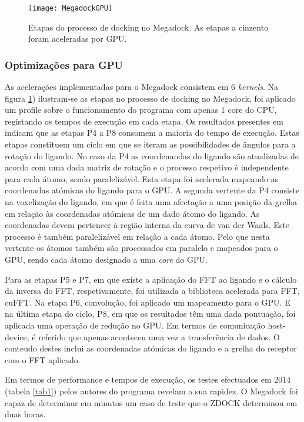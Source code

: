    \begin{figure}[ht]
  \centering
    {\texttt{[image: MegadockGPU]}}
  \caption{Etapas do processo de docking no Megadock. As etapas a cinzento foram aceleradas por GPU\cite{shimoda2015protein}. }
  \label{megadockGPU}
\end{figure}
 \subsubsection{Optimizações para GPU}
As acelerações implementadas para o Megadock consistem em 6 \textit{kernels}. Na figura \ref{megadockGPU}) ilustram-se as etapas no processo de docking no Megadock, foi aplicado um profile sobre o funcionamento do programa com apenas 1  core do CPU, registando os tempos de execução em cada etapa. Os resultados presentes em \cite{shimoda2015protein} indicam que as etapas P4 a P8 consomem a maioria do tempo de execução. Estas etapas constituem um ciclo em que se iteram as possibilidades de ângulos para a rotação do ligando. No caso da P4 as coordenandas do ligando são atualizadas de acordo com uma dada matriz de rotação e o processo respetivo é independente para cada átomo, sendo paralelizável. Esta etapa foi acelerada mapeando as coordenadas atómicas do ligando para o GPU. 
A segunda vertente da P4 consiste na voxelização do ligando, em que é feita uma afectação a uma posição da grelha em relação às coordenadas atómicas de um dado átomo do ligando. As coordenadas devem pertencer à região interna da curva de van der Waals. Este processo é também paralelizável em relação a cada átomo. Pelo que nesta vertente os átomos também são processados em paralelo e mapeados para o GPU, sendo cada átomo designado a uma \textit{core} do GPU.\par Para as etapas P5 e P7, em que existe a aplicação do FFT ao ligando e o cálculo da inversa do FFT, respetivamente, foi utilizada a biblioteca acelerada para FFT, cuFFT. Na etapa P6, convolução, foi aplicado um mapeamento para o GPU. E na última etapa do ciclo, P8, em que os resultados têm uma dada pontuação, foi aplicada uma operação de redução no GPU. 
Em termos de comunicação host-device, é referido que apenas aconteceu uma vez a transferência de dados. O conteudo destes inclui as coordenadas atómicas do ligando e a grelha do receptor com o FFT aplicado. \par
 Em termos de performance e tempos de execução, os testes efectuados em 2014 (tabela \ref{tab1}) pelos autores do programa revelam a sua rapidez. O Megadock foi capaz de determinar em minutos um caso de teste que o ZDOCK determinou em duas horas.
